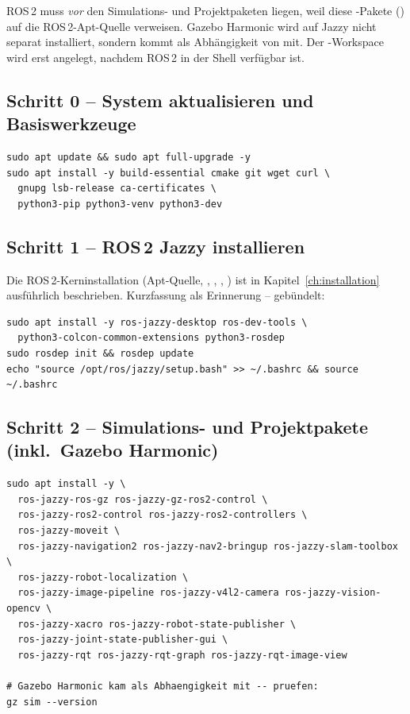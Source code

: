\begin{infobox}[title=Warum die Reihenfolge zählt]
ROS\,2 muss \emph{vor} den Simulations- und Projektpaketen liegen, weil diese
-Pakete () auf die ROS\,2-Apt-Quelle verweisen.
Gazebo Harmonic wird auf Jazzy nicht separat installiert, sondern kommt als
Abhängigkeit von  mit. Der -Workspace wird
erst angelegt, nachdem ROS\,2 in der Shell verfügbar ist.
\end{infobox}

\subsection{Schritt 0 -- System aktualisieren und Basiswerkzeuge}
\begin{lstlisting}[style=bash,caption={Systemaktualisierung und Build-Grundausstattung}]
sudo apt update && sudo apt full-upgrade -y
sudo apt install -y build-essential cmake git wget curl \
  gnupg lsb-release ca-certificates \
  python3-pip python3-venv python3-dev
\end{lstlisting}

\subsection{Schritt 1 -- ROS\,2 Jazzy installieren}
Die ROS\,2-Kerninstallation (Apt-Quelle, ,
\code{ros-dev-tools}, \code{colcon}, \code{rosdep}) ist in
Kapitel~\ref{ch:installation} ausführlich beschrieben. Kurzfassung als
Erinnerung -- gebündelt:
\begin{lstlisting}[style=bash,caption={ROS\,2-Kern (Details siehe Kapitel ``ROS\,2 installieren'')}]
sudo apt install -y ros-jazzy-desktop ros-dev-tools \
  python3-colcon-common-extensions python3-rosdep
sudo rosdep init && rosdep update
echo "source /opt/ros/jazzy/setup.bash" >> ~/.bashrc && source ~/.bashrc
\end{lstlisting}

\subsection{Schritt 2 -- Simulations- und Projektpakete (inkl.\ Gazebo Harmonic)}
\begin{lstlisting}[style=bash,caption={Gazebo Harmonic, ros2\_control, MoveIt2, Nav2, Vision-Pipeline}]
sudo apt install -y \
  ros-jazzy-ros-gz ros-jazzy-gz-ros2-control \
  ros-jazzy-ros2-control ros-jazzy-ros2-controllers \
  ros-jazzy-moveit \
  ros-jazzy-navigation2 ros-jazzy-nav2-bringup ros-jazzy-slam-toolbox \
  ros-jazzy-robot-localization \
  ros-jazzy-image-pipeline ros-jazzy-v4l2-camera ros-jazzy-vision-opencv \
  ros-jazzy-xacro ros-jazzy-robot-state-publisher \
  ros-jazzy-joint-state-publisher-gui \
  ros-jazzy-rqt ros-jazzy-rqt-graph ros-jazzy-rqt-image-view

# Gazebo Harmonic kam als Abhaengigkeit mit -- pruefen:
gz sim --version
\end{lstlisting}

